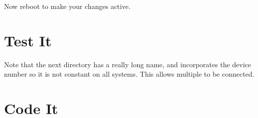 Now reboot to make your changes active.



\section{Test It}








Note that the next directory has a really long name, and incorporates the device number so it is not constant on all systems.  This allows multiple to be connected.





\section{Code It}

